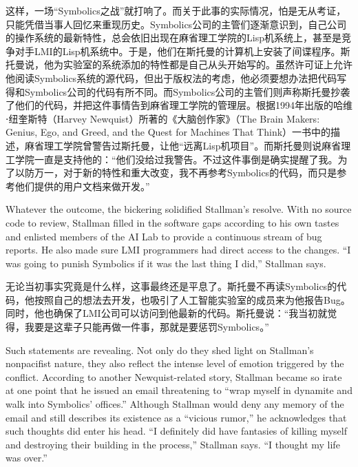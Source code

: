 \ifdefined\chs
这样，一场``Symbolics之战''就打响了。而关于此事的实际情况，怕是无从考证，只能凭借当事人回忆来重现历史。Symbolics公司的主管们逐渐意识到，自己公司的操作系统的最新特性，总会依旧出现在麻省理工学院的Lisp机系统上，甚至是竞争对手LMI的Lisp机系统中。于是，他们在斯托曼的计算机上安装了间谍程序。斯托曼说，他为实验室的系统添加的特性都是自己从头开始写的。虽然许可证上允许他阅读Symbolics系统的源代码，但出于版权法的考虑，他必须要想办法把代码写得和Symbolics公司的代码有所不同。而Symbolics公司的主管们则声称斯托曼抄袭了他们的代码，并把这件事情告到麻省理工学院的管理层。根据1994年出版的哈维⋅纽奎斯特（Harvey Newquist）所著的《大脑创作家》（The Brain Makers: Genius, Ego, and Greed, and the Quest for Machines That Think）一书中的描述，麻省理工学院曾警告过斯托曼，让他``远离Lisp机项目''。而斯托曼则说麻省理工学院一直是支持他的：``他们没给过我警告。不过这件事倒是确实提醒了我。为了以防万一，对于新的特性和重大改变，我不再参考Symbolics的代码，而只是参考他们提供的用户文档来做开发。''
\fi

\ifdefined\eng
Whatever the outcome, the bickering solidified Stallman's resolve. With no source code to review, Stallman filled in the software gaps according to his own tastes and enlisted members of the AI Lab to provide a continuous stream of bug reports. He also made sure LMI programmers had direct access to the changes. ``I was going to punish Symbolics if it was the last thing I did,'' Stallman says.
\fi

\ifdefined\chs
无论当初事实究竟是什么样，这事最终还是平息了。斯托曼不再读Symbolics的代码，他按照自己的想法去开发，也吸引了人工智能实验室的成员来为他报告Bug。同时，他也确保了LMI公司可以访问到他最新的代码。斯托曼说：``我当初就觉得，我要是这辈子只能再做一件事，那就是要惩罚Symbolics。''
\fi

\ifdefined\eng
Such statements are revealing. Not only do they shed light on Stallman's nonpacifist nature, they also reflect the intense level of emotion triggered by the conflict. According to another Newquist-related story, Stallman became so irate at one point that he issued an email threatening to ``wrap myself in dynamite and walk into Symbolics' offices.'' Although Stallman would deny any memory of the email and still describes its existence as a ``vicious rumor,'' he acknowledges that such thoughts did enter his head. ``I definitely did have fantasies of killing myself and destroying their building in the process,'' Stallman says. ``I thought my life was over.''
\fi

